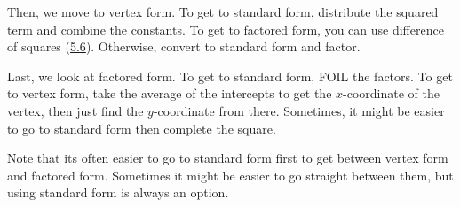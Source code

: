 \documentclass[lang=en,11pt]{elegantbook}
\begin{document}
Then, we move to vertex form.  To get to standard form, distribute the squared term and combine the constants.  To get to factored form, you can use difference of squares (\hyperlink{section.5.6}{5.6}).  Otherwise, convert to standard form and factor.

Last, we look at factored form.  To get to standard form, FOIL the factors.  To get to vertex form, take the average of the intercepts to get the $x$-coordinate of the vertex, then just find the $y$-coordinate from there.  Sometimes, it might be easier to go to standard form then complete the square.

Note that its often easier to go to standard form first to get between vertex form and factored form.  Sometimes it might be easier to go straight between them, but using standard form is always an option.
\end{document}

